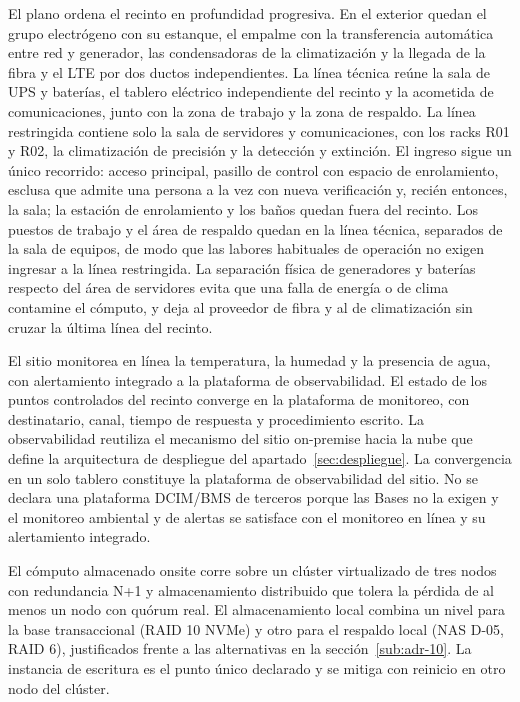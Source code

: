 El plano ordena el recinto en profundidad progresiva. En el exterior quedan el grupo electrógeno con su estanque, el empalme con la transferencia automática entre red y generador, las condensadoras de la climatización y la llegada de la fibra y el LTE por dos ductos independientes. La línea técnica reúne la sala de UPS y baterías, el tablero eléctrico independiente del recinto y la acometida de comunicaciones, junto con la zona de trabajo y la zona de respaldo. La línea restringida contiene solo la sala de servidores y comunicaciones, con los racks R01 y R02, la climatización de precisión y la detección y extinción. El ingreso sigue un único recorrido: acceso principal, pasillo de control con espacio de enrolamiento, esclusa que admite una persona a la vez con nueva verificación y, recién entonces, la sala; la estación de enrolamiento y los baños quedan fuera del recinto. Los puestos de trabajo y el área de respaldo quedan en la línea técnica, separados de la sala de equipos, de modo que las labores habituales de operación no exigen ingresar a la línea restringida. La separación física de generadores y baterías respecto del área de servidores evita que una falla de energía o de clima contamine el cómputo, y deja al proveedor de fibra y al de climatización sin cruzar la última línea del recinto.

El sitio monitorea en línea la temperatura, la humedad y la presencia de agua, con alertamiento integrado a la plataforma de observabilidad. El estado de los puntos controlados del recinto converge en la plataforma de monitoreo, con destinatario, canal, tiempo de respuesta y procedimiento escrito. La observabilidad reutiliza el mecanismo del sitio on-premise hacia la nube que define la arquitectura de despliegue del apartado~\ref{sec:despliegue}. La convergencia en un solo tablero constituye la plataforma de observabilidad del sitio. No se declara una plataforma DCIM/BMS de terceros porque las Bases no la exigen y el monitoreo ambiental y de alertas se satisface con el monitoreo en línea y su alertamiento integrado.

El cómputo almacenado onsite corre sobre un clúster virtualizado de tres nodos con redundancia N+1 y almacenamiento distribuido que tolera la pérdida de al menos un nodo con quórum real. El almacenamiento local combina un nivel para la base transaccional (RAID 10 NVMe) y otro para el respaldo local (NAS D-05, RAID 6), justificados frente a las alternativas en la sección~\ref{sub:adr-10}. La instancia de escritura es el punto único declarado y se mitiga con reinicio en otro nodo del clúster.
